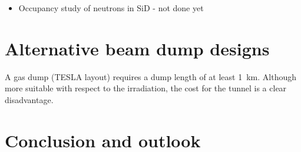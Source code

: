 \begin{itemize}
 \item Occupancy study of neutrons in SiD - not done yet
\end{itemize}

\section{Alternative beam dump designs}
A gas dump (TESLA layout) requires a dump length of at least \SI{1}{\kilo\meter}.
Although more suitable with respect to the irradiation, the cost for the tunnel is a clear disadvantage.
\section{Conclusion and outlook}